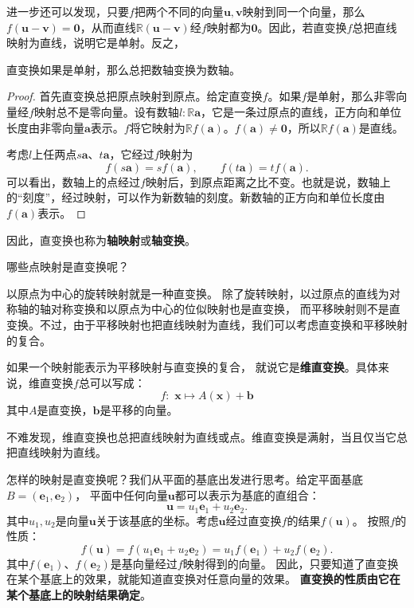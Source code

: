 \documentclass[12pt,UTF8]{ctexbook}
\begin{document}
进一步还可以发现，只要$f$把两个不同的向量$\mathbf{u}, \mathbf{v}$映射到同一个向量，那么$f(\mathbf{u}-\mathbf{v}) = \mathbf{0}$，从而直线$\mathbb{R}(\mathbf{u} - \mathbf{v})$经$f$映射都为$\mathbf{0}$。因此，若直变换$f$总把直线映射为直线，说明它是单射。反之，
\begin{tm}
    直变换如果是单射，那么总把数轴变换为数轴。
\end{tm}
\begin{proof}
    首先直变换总把原点映射到原点。给定直变换$f$。如果$f$是单射，那么非零向量经$f$映射总不是零向量。设有数轴$l: \mathbb{R}\mathbf{a}$，它是一条过原点的直线，正方向和单位长度由非零向量$\mathbf{a}$表示。$f$将它映射为$\mathbb{R}f(\mathbf{a})$。$f(\mathbf{a})\neq \mathbf{0}$，所以$\mathbb{R}f(\mathbf{a})$是直线。

    考虑$l$上任两点$s\mathbf{a}$、$t\mathbf{a}$，它经过$f$映射为
    $$ f(s\mathbf{a}) = sf(\mathbf{a}),\qquad f(t\mathbf{a}) = tf(\mathbf{a}).$$
    可以看出，数轴上的点经过$f$映射后，到原点距离之比不变。也就是说，数轴上的“刻度”，经过映射，可以作为新数轴的刻度。新数轴的正方向和单位长度由$f(\mathbf{a})$表示。
\end{proof}

因此，直变换也称为\textbf{轴映射}或\textbf{轴变换}。

哪些点映射是直变换呢？

以原点为中心的旋转映射就是一种直变换。
除了旋转映射，以过原点的直线为对称轴的轴对称变换和以原点为中心的位似映射也是直变换，
而平移映射则不是直变换。不过，由于平移映射也把直线映射为直线，我们可以考虑直变换和平移映射的复合。

\begin{df}
    如果一个映射能表示为平移映射与直变换的复合，
    就说它是\textbf{维直变换}。具体来说，维直变换$f$总可以写成：
    $$ f: \,\, \mathbf{x} \mapsto A(\mathbf{x}) + \mathbf{b} $$
    其中$A$是直变换，$\mathbf{b}$是平移的向量。
\end{df}
不难发现，维直变换也总把直线映射为直线或点。维直变换是满射，当且仅当它总把直线映射为直线。

怎样的映射是直变换呢？我们从平面的基底出发进行思考。给定平面基底$B = (\mathbf{e}_1, \mathbf{e}_2)$，
平面中任何向量$\mathbf{u}$都可以表示为基底的直组合：
$$ \mathbf{u} = u_1 \mathbf{e}_1 + u_2 \mathbf{e}_2.$$
其中$u_1, u_2$是向量$\mathbf{u}$关于该基底的坐标。考虑$\mathbf{u}$经过直变换$f$的结果$f(\mathbf{u})$。
按照$f$的性质：
$$ f(\mathbf{u}) = f(u_1 \mathbf{e}_1 + u_2 \mathbf{e}_2) = u_1 f(\mathbf{e}_1) + u_2 f(\mathbf{e}_2).$$
其中$f(\mathbf{e}_1)$、$f(\mathbf{e}_2)$是基向量经过$f$映射得到的向量。
因此，只要知道了直变换在某个基底上的效果，就能知道直变换对任意向量的效果。
\textbf{直变换的性质由它在某个基底上的映射结果确定}。
\end{document}
